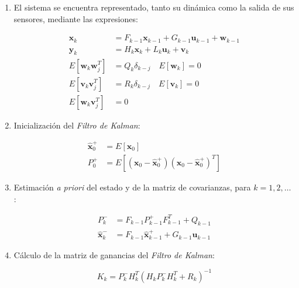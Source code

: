 \begin{enumerate}

\item El sistema se encuentra representado, tanto su dinámica como la salida de sus sensores, mediante las expresiones:

\begin{equation}
\begin{split}
	\boldsymbol{x}_k &= F_{k-1}\boldsymbol{x}_{k-1} + G_{k-1}\boldsymbol{u}_{k-1} + \boldsymbol{w}_{k-1} \\
	\boldsymbol{y}_k &= H_k\boldsymbol{x}_k + L_k\boldsymbol{u}_k + \boldsymbol{v}_k \\
	E[\boldsymbol{w}_k\boldsymbol{w}_j^T] &= Q_k \delta_{k-j} \quad E[\boldsymbol{w}_k] = 0 \\
	E[\boldsymbol{v}_k\boldsymbol{v}_j^T] &= R_k \delta_{k-j} \quad E[\boldsymbol{v}_k] = 0 \\
	E[\boldsymbol{w}_k\boldsymbol{v}_j^T] &= 0
\end{split}
\end{equation}

\item Inicialización del \emph{Filtro de Kalman}:

\begin{equation}
\begin{split}
	\boldsymbol{\hat{x}}_0^{+} &= E[\boldsymbol{x}_0] \\
	P_0^{+} &= E[(\boldsymbol{x}_0 - \boldsymbol{\hat{x}}_0^{+}) (\boldsymbol{x}_0 - \boldsymbol{\hat{x}}_0^{+})^T]
\end{split}
\end{equation}

\item Estimación \emph{a priori} del estado y de la matriz de covarianzas, para $k = 1,2, \ldots$ : 

\begin{equation}
\begin{split}
	P_k^{-} &= F_{k-1}P_{k-1}^{+}F_{k-1}^T + Q_{k-1} \\
	\boldsymbol{\hat{x}}_k^{-} &= F_{k-1}\boldsymbol{\hat{x}}_{k-1}^{+} + G_{k-1}\boldsymbol{u}_{k-1}
\end{split}
\end{equation}

\item Cálculo de la matriz de ganancias del \emph{Filtro de Kalman}:

\begin{equation}
	K_k = P_k^{-}H_k^T(H_kP_k^{-}H_k^T + R_k)^{-1}
\end{equation}


\end{enumerate}
